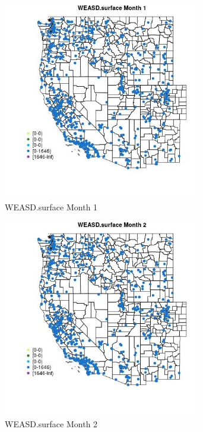 \begin{figure} 
\centering  
\includegraphics[width=0.77\textwidth]{Code_Outputs/Report_ML_input_PM25_Step4_part_e_de_duplicated_aves_compiled_2019-05-21wNAs_MapObsMo1WEASDsurface.jpg} 
\caption{\label{fig:Report_ML_input_PM25_Step4_part_e_de_duplicated_aves_compiled_2019-05-21wNAsMapObsMo1WEASDsurface}WEASD.surface Month 1} 
\end{figure} 
 

\clearpage 

\begin{figure} 
\centering  
\includegraphics[width=0.77\textwidth]{Code_Outputs/Report_ML_input_PM25_Step4_part_e_de_duplicated_aves_compiled_2019-05-21wNAs_MapObsMo2WEASDsurface.jpg} 
\caption{\label{fig:Report_ML_input_PM25_Step4_part_e_de_duplicated_aves_compiled_2019-05-21wNAsMapObsMo2WEASDsurface}WEASD.surface Month 2} 
\end{figure} 
 


